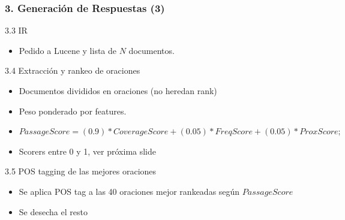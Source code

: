 \begin{frame}
\frametitle{3. Generación de Respuestas (3)}
  \begin{block}{3.3 IR}
  \begin{itemize}
      \item Pedido a Lucene y lista de $N$ documentos.
    \end{itemize}
  \end{block}

  \begin{block}{3.4 Extracción y rankeo de oraciones}
    \begin{itemize}
      \item Documentos divididos en oraciones (no heredan rank)
      \item Peso ponderado por features.
      \item $PassageScore = (0.9)*CoverageScore + (0.05)*FreqScore+ (0.05)*ProxScore;$
      \item Scorers entre 0 y 1, ver próxima slide
    \end{itemize}
  \end{block}

  \begin{block}{3.5 POS tagging de las mejores oraciones}
  \begin{itemize}
      \item Se aplica POS tag a las 40 oraciones mejor rankeadas según $PassageScore$
      \item Se desecha el resto
    \end{itemize}
  \end{block}
\end{frame}

